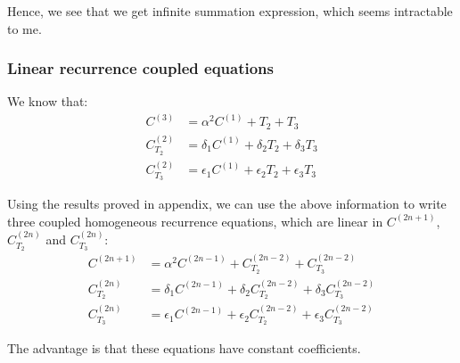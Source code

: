 \documentclass[11pt,a4paper]{article}
\begin{document}
Hence, we see that we get infinite summation expression, which seems intractable to me.
\subsubsection{Linear recurrence coupled equations}
We know that:
\begin{align}
C^{(3)} &=   \alpha^2  C^{(1)}  +T_2  +T_3\\
C^{(2)}_{T_2}&= \delta_1 C^{(1)} + \delta_2 T_2 + \delta_3 T_3 \\
C^{(2)}_{T_3}&= \epsilon_1 C^{(1)} + \epsilon_2 T_2 + \epsilon_3 T_3 
\end{align}

Using the results proved in appendix, we can use the above information to write three coupled homogeneous recurrence equations, which are linear in $C^{(2n+1)}$, $C^{(2n)}_{T_2}$ and $C^{(2n)}_{T_3} $:
\begin{equation}
\boxed{
\begin{aligned}
C^{(2n+1)}&= \alpha^2  C^{(2n-1)} +C^{(2n-2)}_{T_2} + C^{(2n-2)}_{T_3} \\
C^{(2n)}_{T_2} &=\delta_1  C^{(2n-1)} + \delta_2 C^{(2n-2)}_{T_2} + \delta_3 C^{(2n-2)}_{T_3} \\
C^{(2n)}_{T_3} &=\epsilon_1  C^{(2n-1)} + \epsilon_2 C^{(2n-2)}_{T_2} + \epsilon_3  C^{(2n-2)}_{T_3}
\end{aligned}
}
\end{equation}

The advantage is that these equations have constant coefficients. 
%
%
%
%
%
\end{document}
